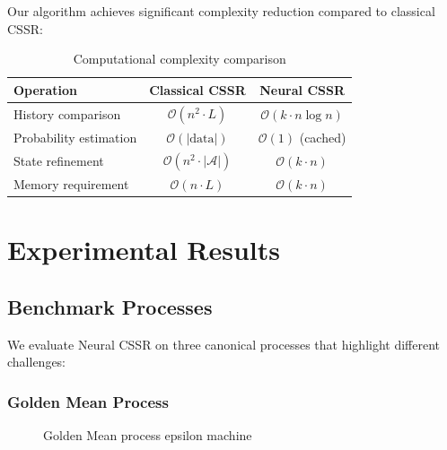 \documentclass[11pt,a4paper]{report}
\newcommand{\alphabet}{\mathcal{A}}
\newcommand{\bigO}{\mathcal{O}}
\theoremstyle{definition}
\begin{document}
Our algorithm achieves significant complexity reduction compared to classical CSSR:

\begin{table}[htbp]
\centering
\caption{Computational complexity comparison}
\label{tab:complexity}
\begin{tabular}{@{}lcc@{}}
\toprule
\textbf{Operation} & \textbf{Classical CSSR} & \textbf{Neural CSSR} \\
\midrule
History comparison & $\bigO(n^2 \cdot L)$ & $\bigO(k \cdot n \log n)$ \\
Probability estimation & $\bigO(|\text{data}|)$ & $\bigO(1)$ (cached) \\
State refinement & $\bigO(n^2 \cdot |\alphabet|)$ & $\bigO(k \cdot n)$ \\
Memory requirement & $\bigO(n \cdot L)$ & $\bigO(k \cdot n)$ \\
\bottomrule
\end{tabular}
\end{table}

\chapter{Experimental Results}
\label{ch:experiments}

\section{Benchmark Processes}
\label{sec:benchmarks}

We evaluate Neural CSSR on three canonical processes that highlight different challenges:

\subsection{Golden Mean Process}

\begin{figure}[htbp]
\centering
{}
\caption{Golden Mean process epsilon machine}
\label{fig:golden-mean}
\end{figure}
\end{document}
